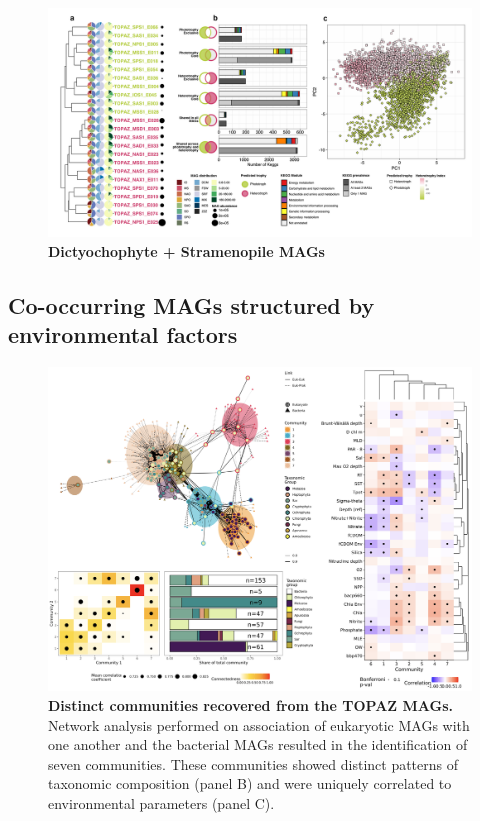 \documentclass[12pt]{article}
\numberwithin{equation}{section}
\begin{document}
\begin{figure}[h!]    
    \centering
    \includegraphics[width = \columnwidth]{figures/Figure5-dendro-dictyo-panels-01.png}
    \caption{ \textbf{Dictyochophyte + Stramenopile MAGs} }
    \label{fig:fig5-dicty}
\end{figure}


\subsection*{Co-occurring MAGs structured by environmental factors } %

\begin{figure}[h!]    %
    \centering
    \includegraphics[width = \columnwidth]{figures/Figure6_Networks.png}
    \caption{ \textbf{Distinct communities recovered from the TOPAZ MAGs.} Network analysis performed on association of eukaryotic MAGs with one another and the bacterial MAGs resulted in the identification of seven communities. These communities showed distinct patterns of taxonomic composition (panel B) and were uniquely correlated to environmental parameters (panel C).}
    \label{fig:fig4-trophy}
\end{figure}
\end{document}
